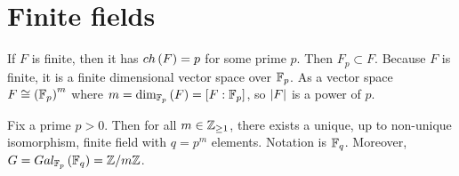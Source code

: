 \pagebreak

\section{Finite fields}


If $ F $ is finite, then it has $ ch\left( F \right) = p $ for some prime $ p $. Then $ F_p \subset F $. Because $ F $ is finite, it is a finite dimensional vector space over $ \mathbb{F}_p $. As a vector space $ F \cong \left( \mathbb{F}_p \right)^m $ where $ m = \dim_{\mathbb{F}_p}\left( F \right) = \left[ F : \mathbb{F}_p \right] $, so $ \left\lvert F \right\rvert $ is a power of $ p $.

\begin{theorem}
Fix a prime $ p > 0 $. Then for all $ m \in \mathbb{Z}_{\ge 1} $, there exists a unique, up to non-unique isomorphism, finite field with $ q = p^m $ elements. Notation is $ \mathbb{F}_q $. Moreover, $ G = Gal_{\mathbb{F}_p}\left( \mathbb{F}_q \right) = \mathbb{Z} / m\mathbb{Z} $.
\end{theorem}

